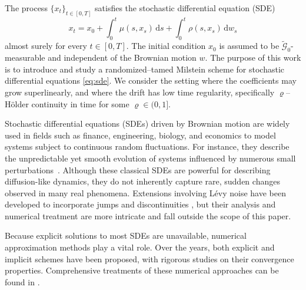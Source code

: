 \documentclass[reqno,  oneside, 12pt]{amsart}
\begin{document}
The process \(\{x_t\}_{t \in [0,T]}\) satisfies the stochastic differential equation (SDE)
\begin{equation}\label{eq:sde}
	x_t = x_0 + \int_0^t \mu(s, x_s) \, \mathrm{d}s + \int_0^t \rho(s, x_s) \, \mathrm{d}w_s
\end{equation}
almost surely for every \( t \in [0,T] \). The initial condition \( x_0 \) is assumed to be \(\tilde{\mathscr{G}}_0\)-measurable and independent of the Brownian motion \( w \).
The purpose of this work is to introduce and study a randomized--tamed Milstein scheme for stochastic differential equations \eqref{eq:sde}. We consider the setting where the coefficients may grow superlinearly, and where the drift has low time regularity, specifically \(\varrho\)--H\"older continuity in time for some \(\varrho \in (0,1]\).





Stochastic differential equations (SDEs) driven by Brownian motion are widely used in fields such as finance, engineering, biology, and economics to model systems subject to continuous random fluctuations. For instance, they describe the unpredictable yet smooth evolution of systems influenced by numerous small perturbations~\cite{Kloeden1992,Mao2007}.
Although these classical SDEs are powerful for describing diffusion-like dynamics, they do not inherently capture rare, sudden changes observed in many real phenomena. Extensions involving L\'evy noise have been developed to incorporate jumps and discontinuities \cite{Cont2004,Oksendal2007,Situ2006}, but their analysis and numerical treatment are more intricate and fall outside the scope of this paper.

Because explicit solutions to most  SDEs are unavailable, numerical approximation methods play a vital role. Over the years, both explicit and implicit schemes have been proposed, with rigorous studies on their convergence properties. Comprehensive treatments of these numerical approaches can be found in \cite{Dereich2011,Higham2006, Kloeden1992, Platen1999,  Platen2010}.
\end{document}

